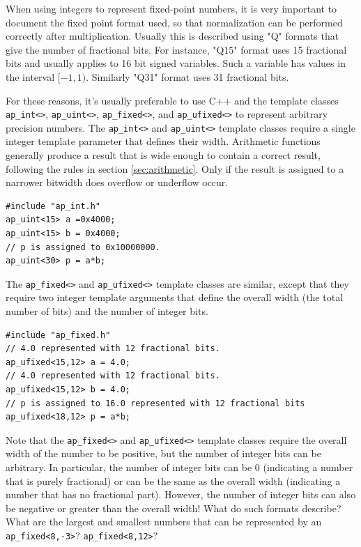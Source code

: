 \begin{aside}
When using integers to represent fixed-point numbers, it is very important to document the fixed point format used, so that normalization can be performed correctly after multiplication.  Usually this is described using "Q" formats that give the number of fractional bits.  For instance, "Q15" format uses 15 fractional bits and usually applies to 16 bit signed variables.  Such a variable has values in the interval $[-1,1)$.  Similarly "Q31" format uses 31 fractional bits.
\end{aside}

For these reasons, it's usually preferable to use C++ and the \VHLS template classes \lstinline|ap_int<>|, \lstinline|ap_uint<>|, \lstinline|ap_fixed<>|, and \lstinline|ap_ufixed<>| to represent arbitrary precision numbers.  The \lstinline|ap_int<>| and \lstinline|ap_uint<>| template classes require a single integer template parameter that defines their width. Arithmetic functions generally produce a result that is wide enough to contain a correct result, following the rules in section \ref{sec:arithmetic}.
Only if the result is assigned to a narrower bitwidth does overflow or underflow occur.
\begin{lstlisting}
#include "ap_int.h"
ap_uint<15> a =0x4000;
ap_uint<15> b = 0x4000;
// p is assigned to 0x10000000.
ap_uint<30> p = a*b; 
\end{lstlisting}

The \lstinline|ap_fixed<>| and \lstinline|ap_ufixed<>| template classes are similar, except that they require two integer template arguments that define the overall width (the total number of bits) and the number of integer bits.
\begin{lstlisting}
#include "ap_fixed.h"
// 4.0 represented with 12 fractional bits.
ap_ufixed<15,12> a = 4.0; 
// 4.0 represented with 12 fractional bits.
ap_ufixed<15,12> b = 4.0; 
// p is assigned to 16.0 represented with 12 fractional bits
ap_ufixed<18,12> p = a*b; 
\end{lstlisting}

\begin{exercise}
Note that the \lstinline|ap_fixed<>| and \lstinline|ap_ufixed<>| template classes require the overall width of the number to be positive, but the number of integer bits can be arbitrary.  In particular, the number of integer bits can be 0 (indicating a number that is purely fractional) or can be the same as the overall width (indicating a number that has no fractional part).  However, the number of integer bits can also be negative or greater than the overall width!  What do such formats describe?  What are the largest and smallest numbers that can be represented by an \lstinline|ap_fixed<8,-3>|? \lstinline|ap_fixed<8,12>|?
\end{exercise}

